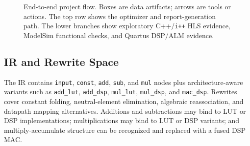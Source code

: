 \documentclass[sigplan,10pt,review]{acmart}
\begin{document}
\begin{figure}[t!]
{
}
\caption{End-to-end project flow. Boxes are data artifacts; arrows are tools or actions. The top row shows the optimizer and report-generation path. The lower branches show exploratory C++/\texttt{i++} HLS evidence, ModelSim functional checks, and Quartus DSP/ALM evidence.}
\label{fig:workflow}
\end{figure}

\subsection{IR and Rewrite Space}
The IR contains \texttt{input}, \texttt{const}, \texttt{add}, \texttt{sub}, and \texttt{mul} nodes plus architecture-aware variants such as \texttt{add\_lut}, \texttt{add\_dsp}, \texttt{mul\_lut}, \texttt{mul\_dsp}, and \texttt{mac\_dsp}. Rewrites cover constant folding, neutral-element elimination, algebraic reassociation, and datapath mapping alternatives. Additions and subtractions may bind to LUT or DSP implementations; multiplications may bind to LUT or DSP variants; and multiply-accumulate structure can be recognized and replaced with a fused DSP MAC.
\end{document}
